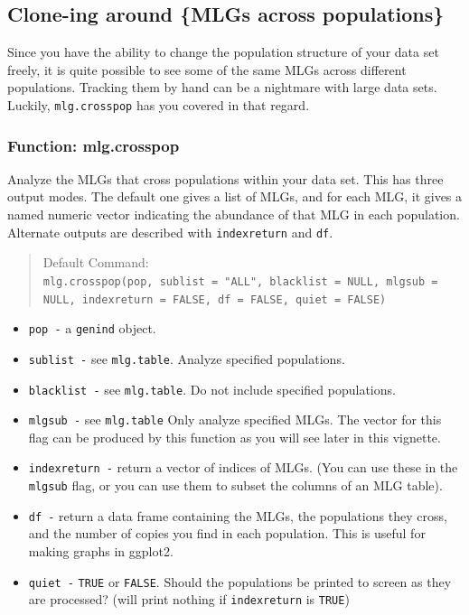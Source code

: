 \documentclass[letterpaper]{article}
\newcommand{\tab}{\hspace*{1em}}
\begin{document}
\subsection{Clone-ing around \{MLGs across populations\}}

\tab\tab Since you have the ability to change the population structure of your data set freely, it is quite possible to see some of the same MLGs across different populations. Tracking them by hand can be a nightmare with large data sets. Luckily, \texttt{mlg.crosspop} has you covered in that regard.
\subsubsection{Function: mlg.crosspop}

\tab\tab Analyze the MLGs that cross populations within your data set. This has three output modes. The default one gives a list of MLGs, and for each MLG, it gives a named numeric vector indicating the abundance of that MLG in each population. Alternate outputs are described with \texttt{indexreturn} and \texttt{df}.
\begin{quote}
Default Command:\\
\texttt{mlg.crosspop(pop, sublist = "ALL", blacklist = NULL, mlgsub = NULL, indexreturn = FALSE, df = FALSE, quiet = FALSE)}
\end{quote}
  \begin{itemize}
    \item \texttt{pop -} a \texttt{genind} object.
    \item \texttt{sublist -} see \texttt{mlg.table}. Analyze specified populations.
    \item \texttt{blacklist -} see \texttt{mlg.table}. Do not include specified populations.
    \item \texttt{mlgsub -} see \texttt{mlg.table} Only analyze specified MLGs. The vector for this flag can be produced by this function as you will see later in this vignette.
    \item \texttt{indexreturn -} return a vector of indices of MLGs. (You can use these in the \texttt{mlgsub} flag, or you can use them to subset the columns of an MLG table). 
    \item \texttt{df -} return a data frame containing the MLGs, the populations they cross, and the number of copies you find in each population. This is useful for making graphs in ggplot2.
    \item \texttt{quiet -} \texttt{TRUE} or \texttt{FALSE}. Should the populations be printed to screen as they are processed? (will print nothing if \texttt{indexreturn} is \texttt{TRUE})
  \end{itemize}
  
\end{document}
